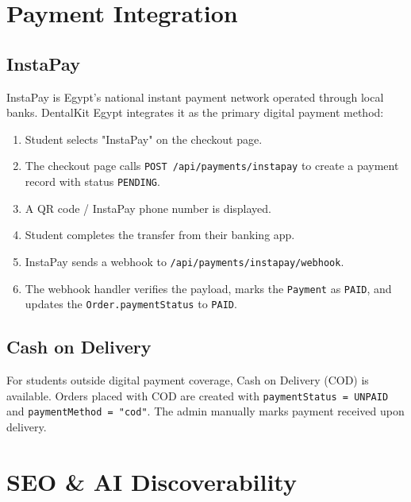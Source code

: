 \documentclass[12pt, a4paper]{article}
\begin{document}
\section{Payment Integration}

\subsection{InstaPay}

InstaPay is Egypt's national instant payment network operated through local banks. DentalKit Egypt integrates it as the primary digital payment method:

\begin{enumerate}[leftmargin=*]
  \item Student selects "InstaPay" on the checkout page.
  \item The checkout page calls \texttt{POST /api/payments/instapay} to create a payment record with status \texttt{PENDING}.
  \item A QR code / InstaPay phone number is displayed.
  \item Student completes the transfer from their banking app.
  \item InstaPay sends a webhook to \texttt{/api/payments/instapay/webhook}.
  \item The webhook handler verifies the payload, marks the \texttt{Payment} as \texttt{PAID}, and updates the \texttt{Order.paymentStatus} to \texttt{PAID}.
\end{enumerate}

\subsection{Cash on Delivery}

For students outside digital payment coverage, Cash on Delivery (COD) is available. Orders placed with COD are created with \texttt{paymentStatus = UNPAID} and \texttt{paymentMethod = "cod"}. The admin manually marks payment received upon delivery.

\section{SEO \& AI Discoverability}
\end{document}

